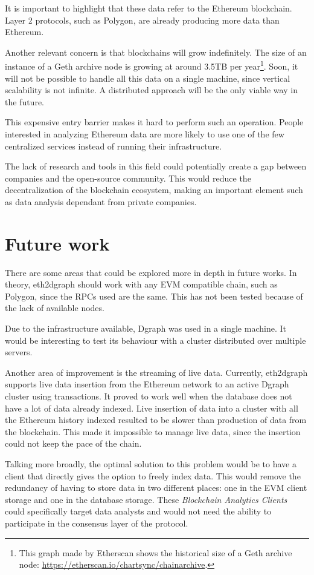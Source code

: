 It is important to highlight that these data refer to the Ethereum blockchain. Layer 2 protocols, such as Polygon, are already producing more data than Ethereum.

Another relevant concern is that blockchains will grow indefinitely. The size of an instance of a Geth archive node is growing at around 3.5TB per year\footnote{This graph made by Etherscan shows the historical size of a Geth archive node: \url{https://etherscan.io/chartsync/chainarchive}.}. Soon, it will not be possible to handle all this data on a single machine, since vertical scalability is not infinite. A distributed approach will be the only viable way in the future.

This expensive entry barrier makes it hard to perform such an operation. People interested in analyzing Ethereum data are more likely to use one of the few centralized services instead of running their infrastructure. 

The lack of research and tools in this field could potentially create a gap between companies and the open-source community. This would reduce the decentralization of the blockchain ecosystem, making an important element such as data analysis dependant from private companies.

\section{Future work}

There are some areas that could be explored more in depth in future works. In theory, eth2dgraph should work with any EVM compatible chain, such as Polygon, since the RPCs used are the same. This has not been tested because of the lack of available nodes.

Due to the infrastructure available, Dgraph was used in a single machine. It would be interesting to test its behaviour with a cluster distributed over multiple servers.

Another area of improvement is the streaming of live data. Currently, eth2dgraph supports live data insertion from the Ethereum network to an active Dgraph cluster using transactions. It proved to work well when the database does not have a lot of data already indexed. Live insertion of data into a cluster with all the Ethereum history indexed resulted to be slower than production of data from the blockchain. This made it impossible to manage live data, since the insertion could not keep the pace of the chain.

Talking more broadly, the optimal solution to this problem would be to have a client that directly gives the option to freely index data. This would remove the redundancy of having to store data in two different places: one in the EVM client storage and one in the database storage. These \textit{Blockchain Analytics Clients} could specifically target data analysts and would not need the ability to participate in the consensus layer of the protocol. 


